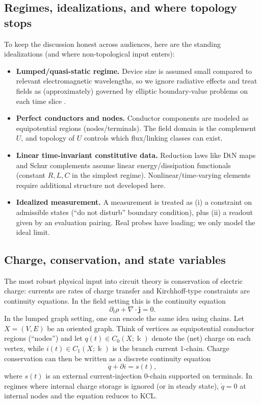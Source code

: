 \documentclass[11pt]{article}
\begin{document}
\subsection{Regimes, idealizations, and where topology stops}
\label{sec:assumptions}
To keep the discussion honest across audiences, here are the standing idealizations (and where non-topological input enters):
\begin{itemize}
  \item \textbf{Lumped/quasi-static regime.} Device size is assumed small compared to relevant electromagnetic wavelengths, so we ignore radiative effects and treat fields as (approximately) governed by elliptic boundary-value problems on each time slice \cite{jackson_em_1998}.
  \item \textbf{Perfect conductors and nodes.} Conductor components are modeled as equipotential regions (nodes/terminals). The field domain is the complement $U$, and topology of $U$ controls which flux/linking classes can exist.
  \item \textbf{Linear time-invariant constitutive data.} Reduction laws like DtN maps and Schur complements assume linear energy/dissipation functionals (constant $R,L,C$ in the simplest regime). Nonlinear/time-varying elements require additional structure not developed here.
  \item \textbf{Idealized measurement.} A measurement is treated as (i) a constraint on admissible states (``do not disturb'' boundary condition), plus (ii) a readout given by an evaluation pairing. Real probes have loading; we only model the ideal limit.
\end{itemize}

\subsection{Charge, conservation, and state variables}
\label{sec:charge-first}
The most robust physical input into circuit theory is conservation of electric charge: currents are rates of charge transfer and Kirchhoff-type constraints are continuity equations.
In the field setting this is the continuity equation
\[
\partial_t\rho + \nabla\cdot \mathbf{j} = 0.
\]
In the lumped graph setting, one can encode the same idea using chains.
Let $X=(V,E)$ be an oriented graph.
Think of vertices as equipotential conductor regions (``nodes'') and let $q(t)\in C_0(X;\Bbbk)$ denote the (net) charge on each vertex, while $i(t)\in C_1(X;\Bbbk)$ is the branch current $1$-chain.
Charge conservation can then be written as a discrete continuity equation
\[
\dot q + \partial i = s(t),
\]
where $s(t)$ is an external current-injection $0$-chain supported on terminals.
In regimes where internal charge storage is ignored (or in steady state), $\dot q=0$ at internal nodes and the equation reduces to KCL.
\end{document}
